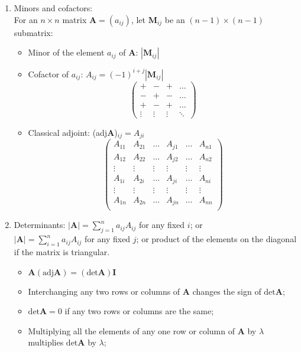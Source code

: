 \documentclass[fleqn]{article}
\begin{document}
\begin{enumerate}
	\item Minors and cofactors:\\
		For an $n\times n$ matrix $\bm{A}=(a_{ij})$, let $\bm{M}_{ij}$ be an $(n-1)\times(n-1)$ submatrix:
		\begin{itemize}[label={--}, topsep=0pt]
			\item Minor of the element $a_{ij}$ of $\bm{A}$: $|\bm{M}_{ij}|$
			\item Cofactor of $a_{ij}$: $A_{ij}=(-1)^{i+j}|\bm{M}_{ij}|$
				\[\begin{pmatrix}
					+ & - & + & \dots \\
					- & + & - & \dots \\
					+ & - & + & \dots \\
					\vdots & \vdots & \vdots & \ddots
				\end{pmatrix}\]
			\item Classical adjoint: (adj$\bm{A}$)$_{ij}=A_{ji}$
				\[\begin{pmatrix}
					A_{11} & A_{21} & \dots  & A_{j1} & \dots  & A_{n1}\\
					A_{12} & A_{22} & \dots  & A_{j2} & \dots  & A_{n2}\\
					\vdots & \vdots & \vdots & \vdots & \vdots & \vdots\\
					A_{1i} & A_{2i} & \dots  & A_{ji} & \dots  & A_{ni}\\
					\vdots & \vdots & \vdots & \vdots & \vdots & \vdots\\
					A_{1n} & A_{2n} & \dots  & A_{jn} & \dots  & A_{nn}\\
				\end{pmatrix}\]
		\end{itemize}
	\item Determinants:\smallbreak
		$|\bm{A}|=\displaystyle\sum_{j=1}^n a_{ij}A_{ij}$ for any fixed $i$; or\\
		$|\bm{A}|=\displaystyle\sum_{i=1}^n a_{ij}A_{ij}$ for any fixed $j$; or\smallbreak
		product of the elements on the diagonal if the matrix is triangular.
		\begin{itemize}[label={--}, topsep=0pt]
			\item $\bm{A}(\text{adj}\bm{A})=(\text{det}\bm{A})\bm{I}$
			\item Interchanging any two rows or columns of $\bm{A}$ changes the sign of $\text{det}\bm{A}$;
			\item $\text{det}\bm{A}=0$ if any two rows or columns are the same;
			\item Multiplying all the elements of any one row or column of $\bm{A}$ by $\lambda$ multiplies $\text{det}\bm{A}$ by $\lambda$;

\end{itemize}
\end{enumerate}
\end{document}
